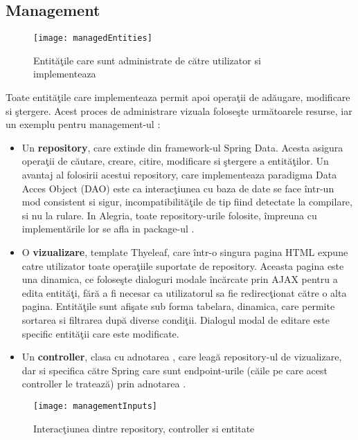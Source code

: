 \subsection{Management}
\begin{figure}[H]
	\centering
	\texttt{[image: managedEntities]}
	\captionsetup{justification=centering}
	\caption{Entităţile care sunt administrate de către utilizator si implementeaza }
	\label{fig:managedEntities}
\end{figure}
Toate entităţile care implementeaza  permit apoi operaţii de adăugare, modificare si ştergere. Acest proces de administrare vizuala foloseşte următoarele resurse, iar un exemplu pentru management-ul :
\begin{itemize}
	\item Un \textbf{repository}, care extinde  din framework-ul Spring Data. Acesta asigura operaţii de căutare, creare, citire, modificare si ştergere a entităţilor. Un avantaj al folosirii  acestui repository, care implementeaza paradigma Data Acces Object (DAO) este ca interacţiunea cu baza de date se face într-un mod consistent si sigur, incompatibilităţile de tip fiind detectate la compilare, si nu la rulare. In Alegria, toate repository-urile folosite, împreuna cu implementările lor se afla in package-ul .
	\item O \textbf{vizualizare}, template Thyeleaf, care într-o singura pagina HTML expune catre utilizator toate operaţiile suportate de repository. Aceasta pagina este una dinamica, ce foloseşte dialoguri modale încărcate prin AJAX pentru a edita entităţi, fără a fi necesar ca utilizatorul sa fie redirecţionat către o alta pagina. Entităţile sunt afişate sub forma tabelara, dinamica, care permite sortarea si filtrarea după diverse condiţii. Dialogul modal de editare este specific entităţii care este modificate. 
	\item Un \textbf{controller}, clasa cu adnotarea , care leagă repository-ul de vizualizare, dar si specifica către Spring care sunt endpoint-urile (căile pe care acest controller le tratează) prin adnotarea .
\end{itemize}
\begin{figure}[H]
	\centering
	\texttt{[image: managementInputs]}
	\caption{Interacţiunea dintre repository, controller si entitate}
	\label{fig:managementInputs}
\end{figure}

